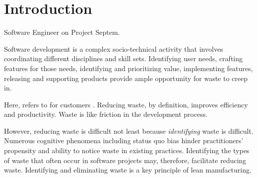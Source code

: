 %
\IEEEpeerreviewmaketitle

\section{Introduction}
 \textemdash Software Engineer on Project Septem.

Software development is a complex socio-technical activity that involves coordinating different disciplines and skill sets. Identifying user needs, crafting features for those needs, identifying and prioritizing value, implementing features, releasing and supporting products provide ample opportunity for waste to creep in. 

Here,  refers to  for customers \cite{WomackLeanThinking}. Reducing waste, by definition, improves efficiency and productivity. Waste is like friction in the development process.

However, reducing waste is difficult not least because \textit{identifying} waste is difficult.  Numerous cognitive phenomena including status quo bias \cite{JostDecadeOfSystemJustification} hinder practitioners' propensity and ability to notice waste in existing practices. Identifying the types of waste that often occur in software projects  may, therefore, facilitate reducing waste. Identifying and eliminating waste is a key principle of lean manufacturing. 

